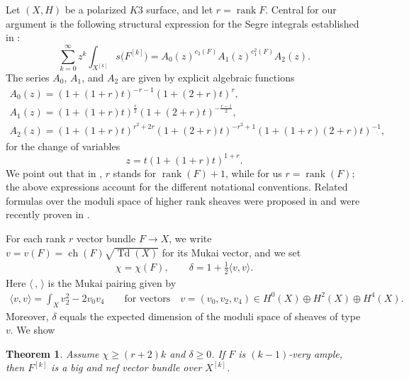 \documentclass[10pt,a4paper]{amsart}
\numberwithin{equation}{section}
\newtheorem{Theorem}{Theorem}[section]
\begin{document}
Let $(X, H)$ be a polarized $K3$ surface, and let $r= \operatorname{rank}F$. Central for our argument is the following structural expression for the Segre integrals established in \cite{MOP}: \begin{equation}\label{eq1}
\sum_{k=0}^{\infty} z^k \int_{X^{[k]}} s \big(F^{[k]}\big) = A_0(z)^{c_2(F)} A_1(z)^{c_1^2(F)} A_2(z).
\end{equation}
{\samepage
The series $A_0$, $A_1$, and $A_2$ are given by explicit algebraic functions
\begin{gather}
A_0(z)= (1+(1+r)t)^{-r-1} (1 + (2+r) t)^{r}, \nonumber
\\
A_1 (z)= (1+(1+r)t)^{\frac{r}{2}} (1 + (2+r) t)^{-\frac{r-1}{2}},\nonumber
\\
A_2 (z)= (1+(1+r)t)^{r^2+2r} (1 + (2+r)t)^{-r^2+1} (1 + (1+r)(2+r)t)^{-1},\label{aaa}
\end{gather}
for the change of variables
\begin{equation*}
z = t (1+(1+r)t)^{1+r}.
\end{equation*}}
We point out that in \cite{MOP}, $r$ stands for $\operatorname{rank}(F) + 1$, while for us $r=\operatorname{rank}(F)$; the above expressions account for the different notational conventions. Related formulas over the moduli space of higher rank sheaves were proposed in \cite{GK} and were recently proven in \cite{Ob}.

For each rank $r$ vector bundle $F\to X$, we write $v=v(F)=\operatorname{ch} (F) \sqrt{\operatorname{Td}(X)}$ for its Mukai vector, and we set
\begin{gather*}
\chi=\chi(F),\qquad \delta=1+\frac{1}{2}\langle v, v\rangle.
\end{gather*}
Here $\langle\,,\, \rangle$ is the Mukai pairing given by
\begin{gather*}
\langle v, v\rangle =\int_{X} v_2^2-2v_0v_4 \qquad
\text{for vectors}\quad v=(v_0, v_2, v_4)\in H^{0}(X)\oplus H^2(X)\oplus H^4(X).
\end{gather*}
Moreover, $\delta$ equals the expected dimension of the moduli space of sheaves of type $v$.
We show

\begin{Theorem}\label{tt}
Assume $\chi \geq (r+2) k$ and $\delta \geq 0$.
If $F$ is $(k-1)$-very ample, then $F^{[k]}$ is a big and nef vector bundle over $X^{[k]}$.
\end{Theorem}
\end{document}
